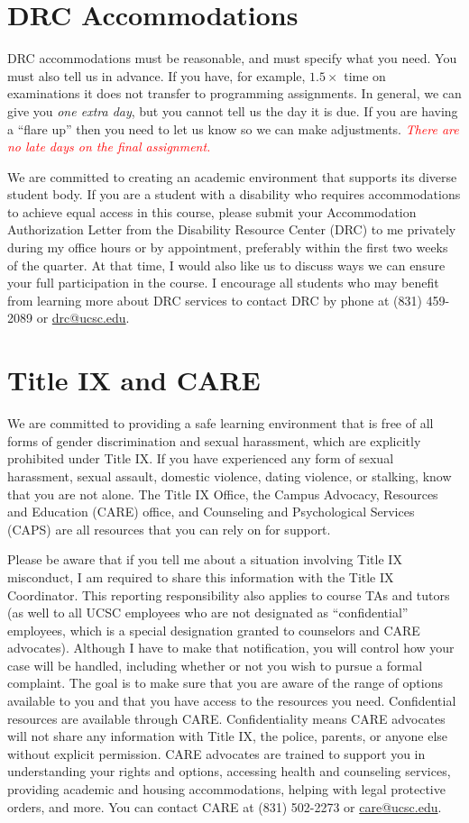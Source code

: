 \documentclass[11pt]{article}
\begin{document}
\section{DRC Accommodations}
DRC accommodations must be reasonable, and must specify what you
need. You must also tell us in advance. If you have, for example,
$1.5\times$ time on examinations it does not transfer to programming
assignments. In general, we can give you \emph{one extra day}, but
you cannot tell us the day it is due. If you are having a ``flare
up'' then you need to let us know so we can make adjustments.
\textcolor{red}{\emph{There are no late days on the final assignment.}}

We are committed to creating an academic environment that
supports its diverse student body. If you are a student with a
disability who requires accommodations to achieve equal access in
this course, please submit your Accommodation Authorization Letter
from the Disability Resource Center (DRC) to me privately during
my office hours or by appointment, preferably within the first two
weeks of the quarter. At that time, I would also like us to discuss
ways we can ensure your full participation in the course. I encourage
all students who may benefit from learning more about DRC services
to contact DRC by phone at (831) 459-2089 or \url{drc@ucsc.edu}.

\section{Title IX and CARE}
We are committed to providing a safe learning environment
that is free of all forms of gender discrimination and sexual
harassment, which are explicitly prohibited under Title IX. If you
have experienced any form of sexual harassment, sexual assault,
domestic violence, dating violence, or stalking, know that you are
not alone. The Title IX Office, the Campus Advocacy, Resources and
Education (CARE) office, and Counseling and Psychological Services
(CAPS) are all resources that you can rely on for support.

Please be aware that if you tell me about a situation involving Title IX
misconduct, I am required to share this information with the Title IX
Coordinator. This reporting responsibility also applies to course TAs and tutors
(as well to all UCSC employees who are not designated as ``confidential''
employees, which is a special designation granted to counselors and CARE
advocates). Although I have to make that notification, you will control how your
case will be handled, including whether or not you wish to pursue a formal
complaint. The goal is to make sure that you are aware of the range of options
available to you and that you have access to the resources you need.
Confidential resources are available through CARE. Confidentiality means CARE
advocates will not share any information with Title IX, the police, parents, or
anyone else without explicit permission.  CARE advocates are trained to support
you in understanding your rights and options, accessing health and counseling
services, providing academic and housing accommodations, helping with legal
protective orders, and more. You can contact CARE at (831) 502-2273 or
\url{care@ucsc.edu}.

\vfill{}
\end{document}
